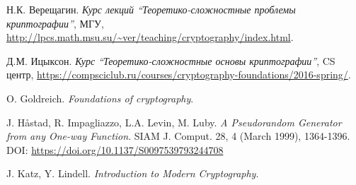 \documentclass[12pt]{article}
\theoremstyle{definition}
\theoremstyle{plain}
\theoremstyle{remark}
\begin{document}
\newpage
\begin{thebibliography}{9}
    
     Н.К. Верещагин. 
        \emph{Курс лекций ``Теоретико-сложностные проблемы криптографии''},
        МГУ, \url{http://lpcs.math.msu.su/~ver/teaching/cryptography/index.html}.
    
     Д.М. Ицыксон. \emph{Курс ``Теоретико-сложностные основы криптографии''}, 
        CS центр, \url{https://compsciclub.ru/courses/cryptography-foundations/2016-spring/}.

     O. Goldreich. \emph{Foundations of cryptography}.

     J. H\aa{}stad, R. Impagliazzo, L.A. Levin, M. Luby. 
        \emph{A Pseudorandom Generator from any One-way Function}.  
        SIAM J. Comput. 28, 4 (March 1999), 1364-1396.\\ 
        DOI: \url{https://doi.org/10.1137/S0097539793244708}
            
     J. Katz, Y. Lindell. \emph{Introduction to Modern Cryptography}.

\end{thebibliography}

\listoftodos
\end{document}
